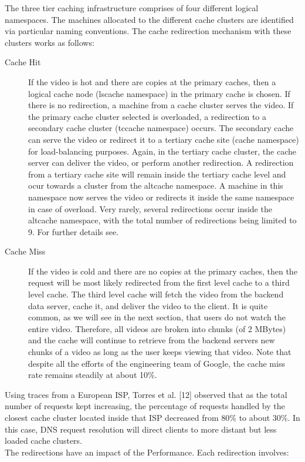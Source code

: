 The three tier caching infrastructure comprises of four different logical namespaces. The machines allocated to the different cache clusters are identified via particular naming conventions. The cache redirection mechanism with these clusters works as follows:

\begin{description}
  \item[Cache Hit] If the video is hot and there are copies at the primary caches, then a logical cache node (lscache namespace) in the primary cache is chosen. If there is no redirection, a machine from a cache cluster serves the video. If the primary cache cluster selected is overloaded, a redirection to a secondary cache cluster (tccache namespace) occurs. The secondary cache can serve the video or redirect it to a tertiary cache site (cache namespace) for load-balancing purposes. Again, in the tertiary cache cluster, the cache server can deliver the video, or perform another redirection. A redirection from a tertiary cache site will remain inside the tertiary cache level and ocur towards a cluster from the altcache namespace. A machine in this namespace now serves the video or redirects it inside the same namespace in case of overload. Very rarely, several redirections occur inside the altcache namespace, with the total number of redirections being limited to 9. For further details
see.

  \item[Cache Miss] If the video is cold and there are no copies at the primary caches, then the request will be most likely redirected from the first level cache to a third level cache. The third level cache will fetch the video from the backend data server, cache it, and deliver the video to the client. It is quite common, as we will see in the next section, that users do not watch the entire video. Therefore, all videos are broken into chunks (of 2 MBytes) and the cache will continue to retrieve from the backend servers new chunks of a video as long as the user keeps viewing that video. Note that despite all the efforts of the engineering team of Google, the cache miss rate remains steadily at about 10\%.
\end{description}

Using traces from a European ISP, Torres et al. [12] observed that as the total number of requests kept increasing, the percentage of requests handled by the closest cache cluster located inside that ISP decreased from 80\% to about 30\%. In this case, DNS request resolution will direct clients to more distant but less loaded cache clusters.\\
The redirections have an impact of the Performance. Each redirection involves:

